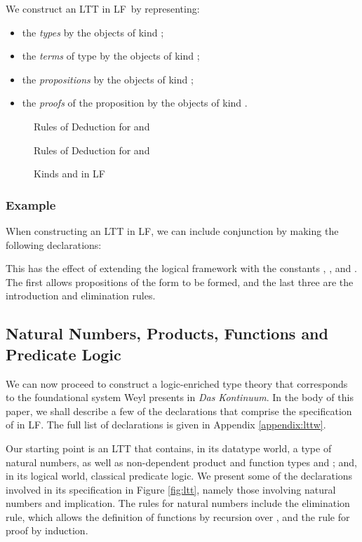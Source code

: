 \documentclass[acmtocl]{acmtrans2m}
\newcommand{\LF}{LF}
\begin{document}
We construct an LTT in \LF~by representing:
\begin{itemize}
\item
the \emph{types} by the objects of kind ;
\item
the \emph{terms} of type  by the objects of kind ;
\item
the \emph{propositions} by the objects of kind ;
\item
the \emph{proofs} of the proposition  by the objects of kind .
\end{itemize}

\begin{figure}[top]
\begin{longenum}
\item
Rules of Deduction for  and 

\item
Rules of Deduction for  and 

\end{longenum}
\caption{Kinds  and  in \LF}
\label{fig:rules}
\end{figure}





\subsubsection{Example}
When constructing an LTT in \LF,
we can include conjunction by making the following declarations:

This has the effect of extending the logical framework with the
constants , ,  and .
The first allows propositions of the form  to be formed,
and the last three are the introduction and elimination rules.





\subsection{Natural Numbers, Products, Functions and Predicate Logic}

We can now proceed to construct a logic-enriched type theory  that
corresponds to the foundational system Weyl presents in \emph{Das
Kontinuum}.
In the body of this paper, we shall describe a few of the declarations that comprise the specification of  in \LF.  The full list of declarations is given in Appendix \ref{appendix:lttw}.

Our starting point is an LTT that contains, in its datatype
world, a type  of natural numbers, as well as
non-dependent product and function types  and ; and, in its logical world, classical predicate
logic.  We present some of the declarations involved in its
specification in Figure \ref{fig:ltt}, namely those involving
natural numbers and implication.  The rules for natural numbers include the elimination rule, which allows the definition of functions by recursion over , and the rule for proof by induction.
\end{document}
